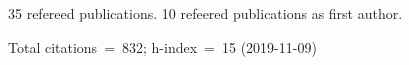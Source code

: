 35 refereed publications. 10 refeered publications as first author.

Total citations~=~832; h-index~=~15 (2019-11-09)